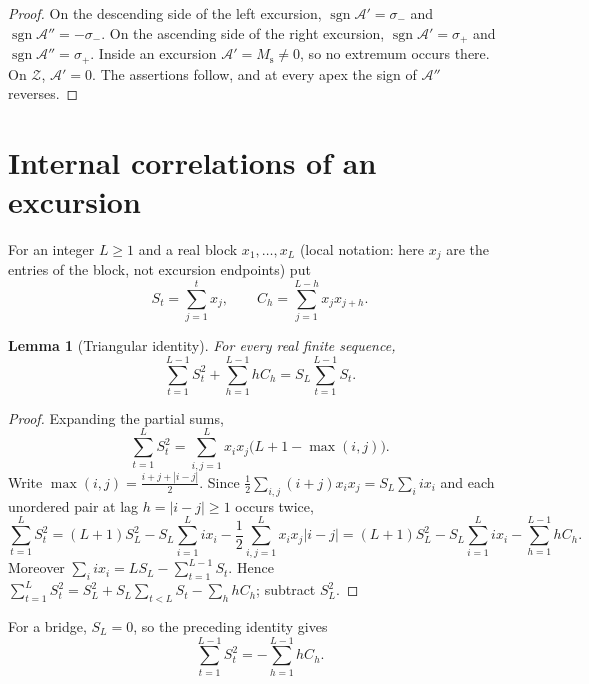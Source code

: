 \documentclass[11pt,reqno]{amsart}
\numberwithin{equation}{section}
\theoremstyle{plain}
\newtheorem{lemma}[theorem]{Lemma}
\theoremstyle{definition}
\theoremstyle{remark}
\DeclareMathOperator{\sgn}{sgn}
\newcommand{\Ms}{M_{\mathrm{s}}}
\newcommand{\Anet}{\mathcal{A}}
\begin{document}
\begin{proof}
On the descending side of the left excursion,
$\sgn\Anet'=\sigma_-$ and $\sgn\Anet''=-\sigma_-$. On the ascending side of
the right excursion, $\sgn\Anet'=\sigma_+$ and $\sgn\Anet''=\sigma_+$. Inside an excursion
$\Anet'=\Ms\ne0$, so no extremum occurs there. On
$\mathcal Z$, $\Anet'=0$. The assertions follow, and at every apex the sign of
$\Anet''$ reverses.
\end{proof}


\section{Internal correlations of an excursion}
\label{sec:internal_corr}

For an integer $L\ge1$ and a real block $x_1,\dots,x_L$ (local notation:
here $x_j$ are the entries of the block, not excursion endpoints) put
\begin{equation}
\label{eq:block_def}
S_t=\sum_{j=1}^t x_j,\qquad
C_h=\sum_{j=1}^{L-h}x_jx_{j+h}.
\end{equation}

\begin{lemma}[Triangular identity]
\label{lem:triangular-corr}
For every real finite sequence,
\begin{equation}
\label{eq:general-triangular}
\sum_{t=1}^{L-1}S_t^2+\sum_{h=1}^{L-1}hC_h
=S_L\sum_{t=1}^{L-1}S_t.
\end{equation}
\end{lemma}

\begin{proof}
Expanding the partial sums,
\begin{equation}
\sum_{t=1}^{L}S_t^2
=\sum_{i,j=1}^{L}x_ix_j\bigl(L+1-\max(i,j)\bigr).
\end{equation}
Write $\max(i,j)=\frac{i+j+|i-j|}{2}$. Since
$\frac12\sum_{i,j}(i+j)x_ix_j=S_L\sum_i ix_i$ and each unordered pair at
lag $h=|i-j|\ge1$ occurs twice,
\begin{equation}
\sum_{t=1}^{L}S_t^2=(L+1)S_L^2-S_L\sum_{i=1}^{L}ix_i
-\frac12\sum_{i,j=1}^{L}x_ix_j|i-j|
=(L+1)S_L^2-S_L\sum_{i=1}^{L}ix_i-\sum_{h=1}^{L-1}hC_h .
\end{equation}
Moreover $\sum_i ix_i=LS_L-\sum_{t=1}^{L-1}S_t$.
Hence
$\sum_{t=1}^{L}S_t^2=S_L^2+S_L\sum_{t<L}S_t-\sum_hhC_h$; subtract $S_L^2$.
\end{proof}

For a bridge, $S_L=0$, so the preceding identity gives
\begin{equation}
\label{eq:bridge-triangular}
\sum_{t=1}^{L-1}S_t^2=-\sum_{h=1}^{L-1}hC_h.
\end{equation}
\end{document}
